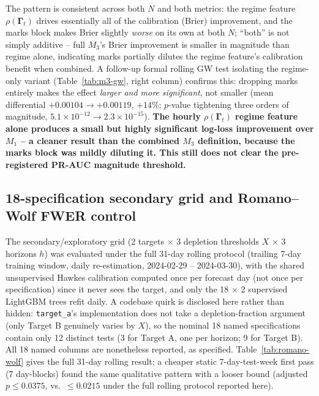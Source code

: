 The pattern is consistent across both $N$ and both metrics: the regime
feature $\rho(\boldsymbol{\Gamma}_t)$ drives essentially all of the
calibration (Brier) improvement, and the marks block makes Brier slightly
\emph{worse} on its own at both $N$; ``both'' is not simply additive --
full $M_3$'s Brier improvement is smaller in magnitude than regime alone,
indicating marks partially dilutes the regime feature's calibration
benefit when combined. A follow-up formal rolling GW test isolating the
regime-only variant (Table~\ref{tab:m3-gw}, right column) confirms this:
dropping marks entirely makes the effect \emph{larger and more
significant}, not smaller (mean differential $+0.00104 \to +0.00119$,
$+14\%$; $p$-value tightening three orders of magnitude, $5.1\times
10^{-12} \to 2.3\times10^{-15}$). \textbf{The hourly $\rho(\boldsymbol{\Gamma}_t)$
regime feature alone produces a small but highly significant log-loss
improvement over $M_1$ -- a cleaner result than the combined $M_3$
definition, because the marks block was mildly diluting it. This still
does not clear the pre-registered PR-AUC magnitude threshold.}

\subsection{18-specification secondary grid and Romano--Wolf FWER control}
\label{sec:results-secondary-grid}

The secondary/exploratory grid (2 targets $\times$ 3 depletion thresholds
$X$ $\times$ 3 horizons $h$) was evaluated under the full 31-day rolling
protocol (trailing 7-day training window, daily re-estimation,
2024-02-29 -- 2024-03-30), with the shared unsupervised Hawkes calibration
computed once per forecast day (not once per specification) since it
never sees the target, and only the 18 $\times$ 2 supervised LightGBM
trees refit daily. A codebase quirk is disclosed here rather than hidden:
\texttt{target\_a}'s implementation does not take a depletion-fraction
argument (only Target B genuinely varies by $X$), so the nominal 18
named specifications contain only 12 distinct tests (3 for Target A, one
per horizon; 9 for Target B). All 18 named columns are nonetheless
reported, as specified. Table~\ref{tab:romano-wolf} gives the full
31-day rolling result; a cheaper static 7-day-test-week first pass (7
day-blocks) found the same qualitative pattern with a looser bound
(adjusted $p \le 0.0375$, vs.\ $\le 0.0215$ under the full rolling
protocol reported here).

